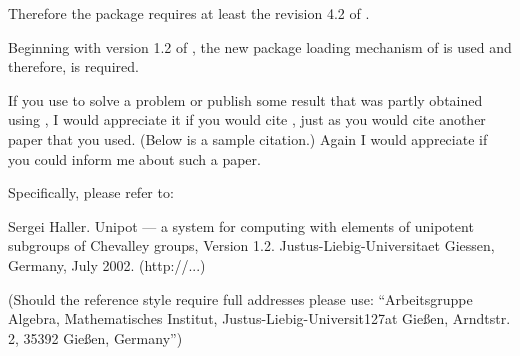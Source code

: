 Therefore  the package  requires at least  the  revision  4.2 of
{\GAP}.

Beginning with version 1.2 of \Unipot, the new package loading
mechanism of  is used and therefore,  is required.


% 



If you  use {\Unipot} to solve a problem or publish some  result
that was partly obtained  using {\Unipot}, I would appreciate it
if you would  cite {\Unipot},  just  as you  would  cite another
paper that you used. (Below is a sample citation.) Again I would
appreciate if you could inform me about such a paper.

Specifically, please refer to:
 
\begintt
[Hal02] Sergei Haller. Unipot --- a system for computing with elements
        of unipotent subgroups of Chevalley groups, Version 1.2.
        Justus-Liebig-Universitaet Giessen, Germany, July 2002. 
        (http://...)
\endtt
 
(Should the reference style require full addresses please use:
``Arbeitsgruppe Algebra,
  Mathematisches Institut,
  Justus-Liebig-Universit{\accent127a}t Gie{\ss}en,
  Arndtstr. 2,
  35392 Gie{\ss}en, Germany'')





